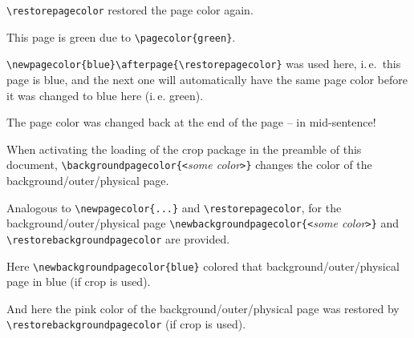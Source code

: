 \documentclass[british]{article}[2024/06/29]%
\begin{document}
\newpage
\restorepagecolor

{\color{white}\verb|\restorepagecolor| restored the page color again.}

\newpage
\pagecolor{green}

This page is green due to \verb|\pagecolor{green}|.

\newpage
{}\afterpage{\restorepagecolor}

{\color{white}\verb|\newpagecolor{blue}\afterpage{\restorepagecolor}|%
\newline
was used here, i.\,e.~this page is blue, and the next one will
automatically have the same page color before it was changed to blue
here (i.\,e. green).}

\smallskip
{\color{red}\textbf{\lipsum[1-11]}}
\bigskip

The page color was changed back at the end of the page --
in mid-sentence!

\newpage
{}

When activating the loading of the crop package in the preamble of this
document, \verb|\backgroundpagecolor{<|\textit{some color}\verb|>}|
changes the color of the background/outer/physical page.

\newpage
{}

Analogous to \verb|\newpagecolor{...}| and \verb|\restorepagecolor|,
for the background/outer/physical page
\verb|\newbackgroundpagecolor{<|\textit{some color}\verb|>}| and\linebreak
\verb|\restorebackgroundpagecolor| are provided.

Here \verb|\newbackgroundpagecolor{blue}| colored that
background/outer/physical page in blue (if crop is used).

\newpage
\restorebackgroundpagecolor

And here the pink color of the background/outer/physical page
was restored by \verb|\restorebackgroundpagecolor| (if crop is used).
\end{document}
